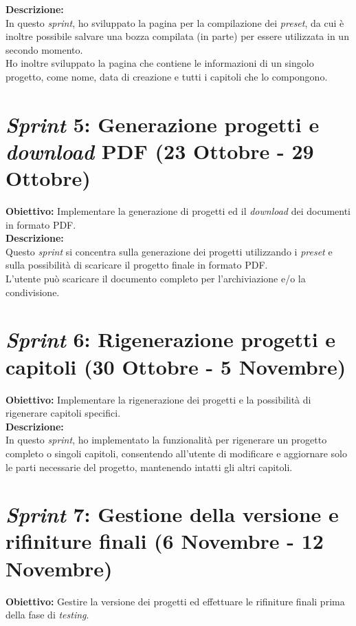 \noindent \textbf{Descrizione:}\\
\noindent In questo \textit{sprint}, ho sviluppato la pagina per la compilazione dei \textit{preset}, da cui è inoltre possibile salvare una bozza compilata (in parte) per essere utilizzata in un secondo momento.\\
Ho inoltre sviluppato la pagina che contiene le informazioni di un singolo progetto, come nome, data di creazione e tutti i capitoli che lo compongono.\\  

\section*{\textit{Sprint} 5: Generazione progetti e \textit{download} PDF (23 Ottobre - 29 Ottobre)}
\textbf{Obiettivo:} Implementare la generazione di progetti ed il \textit{download} dei documenti in formato PDF.\\

\noindent \textbf{Descrizione:}\\
\noindent Questo \textit{sprint} si concentra sulla generazione dei progetti utilizzando i \textit{preset} e sulla possibilità di scaricare il progetto finale in formato PDF.\\
L'utente può scaricare il documento completo per l'archiviazione e/o la condivisione.\\

\section*{\textit{Sprint} 6: Rigenerazione progetti e capitoli (30 Ottobre - 5 Novembre)}
\textbf{Obiettivo:} Implementare la rigenerazione dei progetti e la possibilità di rigenerare capitoli specifici.\\

\noindent \textbf{Descrizione:}\\
\noindent In questo \textit{sprint}, ho implementato la funzionalità per rigenerare un progetto completo o singoli capitoli, consentendo all'utente di modificare e aggiornare solo le parti necessarie del progetto, mantenendo intatti gli altri capitoli.\\

\section*{\textit{Sprint} 7: Gestione della versione e rifiniture finali (6 Novembre - 12 Novembre)}
\textbf{Obiettivo:} Gestire la versione dei progetti ed effettuare le rifiniture finali prima della fase di \textit{testing}.\\

